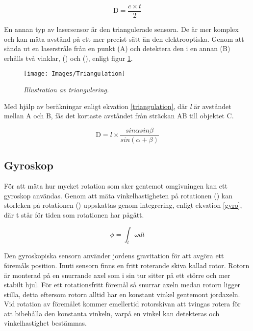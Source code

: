\documentclass[11pt]{article}
\begin{document}
\begin{flushleft}
\begin{equation}\label{laser_eq}
\textrm{D} = \frac {c \times t}{2} 
\end{equation}

En annan typ av lasersensor är den triangulerade sensorn. De är mer komplex och kan mäta avstånd på ett mer precist sätt än den elektrooptiska. Genom att sända ut en laserstråle från en punkt (A) och detektera den i en annan (B) erhålls två vinklar, (\textalpha) och (\textbeta), enligt figur \ref{Triangulation}. 

\begin{figure}[htbp]
	\centering
	\texttt{[image: Images/Triangulation]}
	\caption{\textit{Illustration av triangulering.} \label{Triangulation}}
\end{figure}

Med hjälp av beräkningar enligt ekvation \ref{triangulation}, där \textit{l} är avståndet mellan A och B, fås det kortaste avståndet från sträckan AB till objektet C. \cite{website:triangulation} \cite{website:mti}

\begin{equation}\label{triangulation}
\textrm{D} = l\times\frac {sin\alpha sin\beta}{sin(\alpha + \beta)} 
\end{equation}




\subsection{Gyroskop}
För att mäta hur mycket rotation som sker gentemot omgivningen kan ett gyroskop användas. Genom att mäta vinkelhastigheten på rotationen (\textomega) kan storleken på rotationen (\straightphi) uppskattas genom integrering, enligt ekvation \ref{gyro}, där t står för tiden som rotationen har pågått. \cite{Gyroscope}

\begin{equation}\label{gyro}
	\phi = \int_{t}^{ }\omega dt 						
\end{equation}

Den gyroskopiska sensorn använder jordens gravitation för att avgöra ett föremåls position. Inuti sensorn finns en fritt roterande skiva kallad rotor. Rotorn är monterad på en snurrande axel som i sin tur sitter på ett större och mer stabilt hjul. För ett rotationsfritt föremål så snurrar axeln medan rotorn ligger stilla, detta eftersom rotorn alltid har en konstant vinkel gentemont jordaxeln. Vid rotation av föremålet kommer emellertid rotorskivan att tvingas rotera för att bibehålla den konstanta vinkeln, varpå en vinkel kan detekteras och vinkelhastighet bestämmas. \cite{Gyro}


\end{flushleft}
\end{document}
